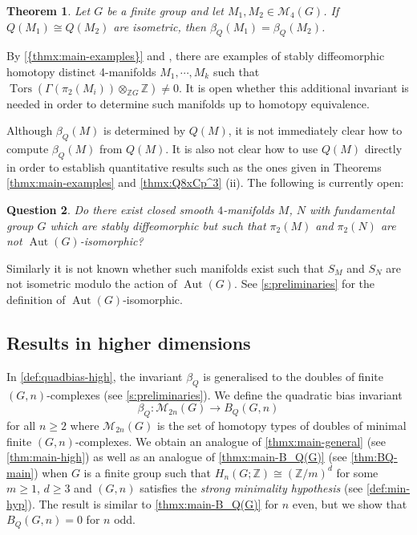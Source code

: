 \documentclass[11pt,a4paper,leqno]{amsart}
\newtheorem{theorem}{Theorem}[section]
\newtheorem{question}[theorem]{Question}
\theoremstyle{definition}
\theoremstyle{remark}
\newcommand{\Z}{\mathbb{Z}}
\DeclareMathOperator{\Aut}{Aut}
\DeclareMathOperator{\Tors}{Tors}
\newcommand{\sM}{\mathscr{M}}
\begin{document}
\begin{theorem} \label{thm:main-Q2type}
Let $G$ be a finite group and let $M_1, M_2 \in \sM_{4}(G)$.
If $Q(M_1) \cong Q(M_2)$ are isometric, then $\beta_Q(M_1) = \beta_Q(M_2)$.
\end{theorem}

By \cref{{thmx:main-examples}} and \cite{KPR24,KNR22,Hambleton:1988,Ba88}, there are examples of stably diffeomorphic homotopy distinct 4-manifolds $M_1, \cdots, M_k$ such that $\Tors(\Gamma(\pi_2(M_i)) \otimes_{\Z G} \Z) \ne 0$. It is open whether this additional invariant is needed in order to determine such manifolds up to homotopy equivalence.

Although $\beta_Q(M)$ is determined by $Q(M)$, it is not immediately clear how to compute $\beta_Q(M)$ from $Q(M)$. It is also not clear how to use $Q(M)$ directly in order to establish quantitative results such as the ones given in Theorems \ref{thmx:main-examples} and \ref{thmx:Q8xCp^3} (ii). The following is currently open:

\begin{question} \label{question:pi2}
Do there exist closed smooth $4$-manifolds $M$, $N$ with fundamental group $G$ which are stably diffeomorphic but such that $\pi_2(M)$ and $\pi_2(N)$ are not $\Aut(G)$-isomorphic?
\end{question}

Similarly it is not known whether such manifolds exist such that $S_M$ and $S_N$ are not isometric modulo the action of $\Aut(G)$.
See \cref{s:preliminaries} for the definition of $\Aut(G)$-isomorphic.

\subsection{Results in higher dimensions}

In \cref{def:quadbias-high}, the invariant $\beta_Q$ is generalised to the doubles of finite $(G,n)$-complexes (see \cref{s:preliminaries}).
We define the quadratic bias invariant  
$$\beta_Q \colon \sM_{2n}(G) \to B_Q(G,n)$$
for all $n \ge 2$ where $\sM_{2n}(G)$ is the set of homotopy types of doubles of minimal finite $(G,n)$-complexes.
We obtain an analogue of \cref{thmx:main-general} (see \cref{thm:main-high}) as well as an analogue of \cref{thmx:main-B_Q(G)} (see \cref{thm:BQ-main}) when $G$ is a finite group such that $H_n(G;\Z) \cong (\Z/m)^d$ for some $m \ge 1$, $d \ge 3$ and $(G,n)$ satisfies the \textit{strong minimality hypothesis} (see \cref{def:min-hyp}).
The result is similar to \cref{thmx:main-B_Q(G)} for $n$ even, but we show that $B_Q(G,n) = 0$ for $n$ odd.
\end{document}
